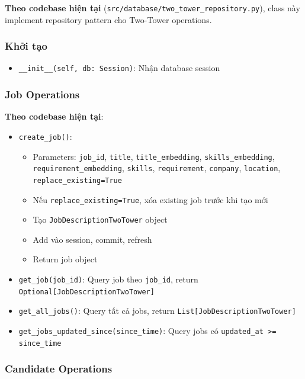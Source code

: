 \textbf{Theo codebase hiện tại} (\texttt{src/database/two\_tower\_repository.py}), class này implement repository pattern cho Two-Tower operations.

\subsubsection{Khởi tạo}

\begin{itemize}
    \item \texttt{\_\_init\_\_(self, db: Session)}: Nhận database session
\end{itemize}

\subsubsection{Job Operations}

\textbf{Theo codebase hiện tại}:

\begin{itemize}
    \item \texttt{create\_job()}:
    \begin{itemize}
        \item Parameters: \texttt{job\_id}, \texttt{title}, \texttt{title\_embedding}, \texttt{skills\_embedding}, \texttt{requirement\_embedding}, \texttt{skills}, \texttt{requirement}, \texttt{company}, \texttt{location}, \texttt{replace\_existing=True}
        \item Nếu \texttt{replace\_existing=True}, xóa existing job trước khi tạo mới
        \item Tạo \texttt{JobDescriptionTwoTower} object
        \item Add vào session, commit, refresh
        \item Return job object
    \end{itemize}
    \item \texttt{get\_job(job\_id)}: Query job theo \texttt{job\_id}, return \texttt{Optional[JobDescriptionTwoTower]}
    \item \texttt{get\_all\_jobs()}: Query tất cả jobs, return \texttt{List[JobDescriptionTwoTower]}
    \item \texttt{get\_jobs\_updated\_since(since\_time)}: Query jobs có \texttt{updated\_at >= since\_time}
\end{itemize}

\subsubsection{Candidate Operations}


